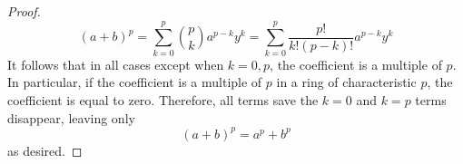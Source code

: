 \documentclass[../psets.tex]{subfiles}
\begin{document}
\begin{enumerate}
\begin{proof}
        \begin{equation*}
            (a+b)^p = \sum_{k=0}^p\binom{p}{k}a^{p-k}y^k
            = \sum_{k=0}^p\frac{p!}{k!(p-k)!}a^{p-k}y^k
        \end{equation*}
        It follows that in all cases except when $k=0,p$, the coefficient is a multiple of $p$. In particular, if the coefficient is a multiple of $p$ in a ring of characteristic $p$, the coefficient is equal to zero. Therefore, all terms save the $k=0$ and $k=p$ terms disappear, leaving only
        \begin{equation*}
            (a+b)^p = a^p+b^p
        \end{equation*}
        as desired.
    \end{proof}
\end{enumerate}
\end{document}
